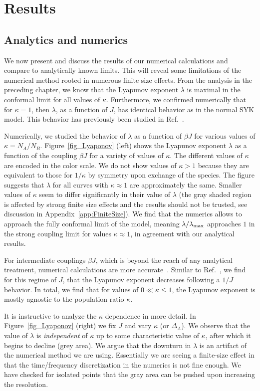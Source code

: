 \section{Results}
\label{sec_Results}
\subsection{Analytics and numerics}
We now present and discuss the results of our numerical calculations and compare to analytically known limits. This will reveal some limitations of the numerical method rooted in numerous finite size effects. 
From the analysis in the preceding chapter, we know that the Lyapunov exponent $\lambda$ is maximal in the conformal limit for all values of $\kappa$.
Furthermore, we confirmed numerically that for $\kappa=1$, then $\lambda$, as a function of $J$, has identical behavior as in the normal SYK model.
This behavior has previously been studied in Ref.~\cite{maldacena_comments_2016}. 

Numerically, we studied the behavior of $\lambda$ as a function of $\beta J$ for various values of $\kappa=N_A/N_B$.
Figure~\ref{fig_Lyaponov} (left) shows the Lyapunov exponent $\lambda$ as a function of the coupling $\beta J$ for a variety of values of $\kappa$. The different values of $\kappa$ are encoded in the color scale. We do not show values of $\kappa>1$ because they are equivalent to those for $1/\kappa$ by symmetry upon exchange of the species.
The figure suggests that $\lambda$ for all curves with $\kappa\approx1$ are approximately the same. Smaller values of $\kappa$ seem to differ significantly in their value of $\lambda$ (the gray shaded region is affected by strong finite size effects and the results should not be trusted, see discussion in Appendix~\ref{app:FiniteSize}).
We find that the numerics allows to approach the fully conformal limit of the model, meaning $\lambda/\lambda_{\rm{max}}$ approaches $1$ in the strong coupling limit for values $\kappa \approx 1$, in agreement with our analytical results.

For intermediate couplings $\beta J$, which is beyond the reach of any analytical treatment, numerical calculations are more accurate~\cite{maldacena_comments_2016}.
Similar to Ref.~\cite{maldacena_comments_2016}, we find for this regime of $J$, that the Lyapunov exponent decreases following a $1/J$ behavior.
In total, we find that for values of $0 \ll \kappa\leq 1$, the Lyapunov exponent is mostly agnostic to the population ratio $\kappa$.


It is instructive to analyze the $\kappa$ dependence in more detail.
In Figure~\ref{fig_Lyaponov} (right) we fix $J$ and vary $\kappa$ (or $\Delta_A$).
We observe that the value of $\lambda$ is \emph{independent} of $\kappa$ up to some characteristic value of $\kappa$, after which it begins to decline (grey area).
We argue that the downturn in $\lambda$ is an artifact of the numerical method we are using. Essentially we are seeing a finite-size effect in that the time/frequency discretization in the numerics is not fine enough. We have checked for isolated points that the gray area can be pushed upon increasing the resolution. 

